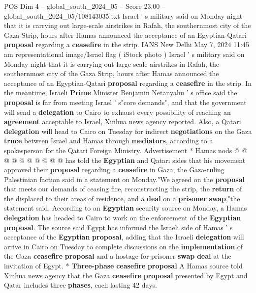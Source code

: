 \begin{textsample}{POS Dim 4 – global\_south\_2024\_05 – Score 23.00 – global\_south\_2024\_05/108143035.txt}  \label{ex:f4_pos_206}
Israel ' s military said on Monday night that it is carrying out large-scale airstrikes in Rafah, the southernmost city of the Gaza Strip, hours after Hamas announced the acceptance of an Egyptian-Qatari \textbf{proposal} regarding a \textbf{ceasefire} in the strip.
IANS New Delhi May 7, 2024 11:45 am representational image/Israel flag ( iStock photo ) Israel ' s military said on Monday night that it is carrying out large-scale airstrikes in Rafah, the southernmost city of the Gaza Strip, hours after Hamas announced the acceptance of an Egyptian-Qatari \textbf{proposal} regarding a \textbf{ceasefire} in the strip.
In the meantime, Israeli \textbf{Prime} Minister Benjamin Netanyahu ' s office said the \textbf{proposal} is far from meeting Israel ' s"core demands", and that the government will send a \textbf{delegation} to Cairo to exhaust every possibility of reaching an \textbf{agreement} acceptable to Israel, Xinhua news agency reported.
Also, a Qatari \textbf{delegation} will head to Cairo on Tuesday for indirect \textbf{negotiations} on the Gaza \textbf{truce} between Israel and Hamas through \textbf{mediators}, according to a spokesperson for the Qatari Foreign Ministry.
Advertisement * Hamas nods @ @ @ @ @ @ @ @ @ @ has told the \textbf{Egyptian} and Qatari sides that his movement approved their \textbf{proposal} regarding a \textbf{ceasefire} in Gaza, the Gaza-ruling Palestinian faction said in a statement on Monday."We agreed on the \textbf{proposal} that meets our demands of ceasing fire, reconstructing the strip, the \textbf{return} of the displaced to their areas of residence, and a \textbf{deal} on a \textbf{prisoner} \textbf{swap},"the statement said.
According to an \textbf{Egyptian} security source on Monday, a Hamas \textbf{delegation} has headed to Cairo to work on the enforcement of the \textbf{Egyptian} \textbf{proposal}.
The source said Egypt has informed the Israeli side of Hamas ' s acceptance of the \textbf{Egyptian} \textbf{proposal}, adding that the Israeli \textbf{delegation} will arrive in Cairo on Tuesday to complete discussions on the \textbf{implementation} of the Gaza \textbf{ceasefire} \textbf{proposal} and a hostage-for-prisoner \textbf{swap} \textbf{deal} at the invitation of Egypt. * \textbf{Three-phase} \textbf{ceasefire} \textbf{proposal} A Hamas source told Xinhua news agency that the Gaza \textbf{ceasefire} \textbf{proposal} presented by Egypt and Qatar includes three \textbf{phases}, each lasting 42 days.

\end{textsample}
